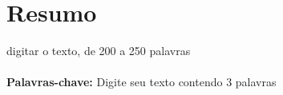 \section*{Resumo}
digitar o texto, de 200 a 250 palavras \\ \\
\textbf{Palavras-chave:} Digite seu texto contendo 3 palavras

